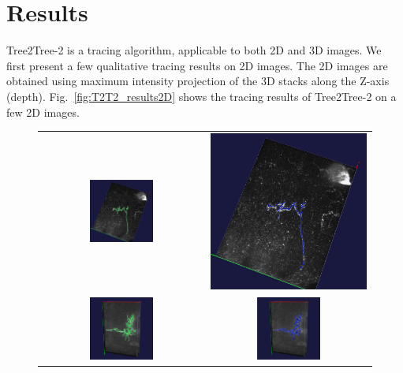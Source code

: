 \section{Results}
Tree2Tree-2 is a tracing algorithm, applicable to both 2D and 3D images. We first present a few qualitative tracing results on 2D images. The 2D images are obtained using maximum intensity projection of the 3D stacks along the Z-axis (depth). Fig.~\ref{fig:T2T2_results2D} shows the tracing results of Tree2Tree-2 on a few 2D images. 
\begin{figure}[t]
\centering
\begin{tabular}{cc}
\includegraphics[width=0.4\textwidth]{images/ch3/T2T2_3D1_org}	&
\includegraphics[height=0.4\textwidth]{images/ch3/T2T2_3D1}	\\
\includegraphics[width=0.4\textwidth]{images/ch3/T2T2_3D2_org}	&
\includegraphics[width=0.4\textwidth]{images/ch3/T2T2_3D2}	\\

\end{tabular}
\end{figure}
